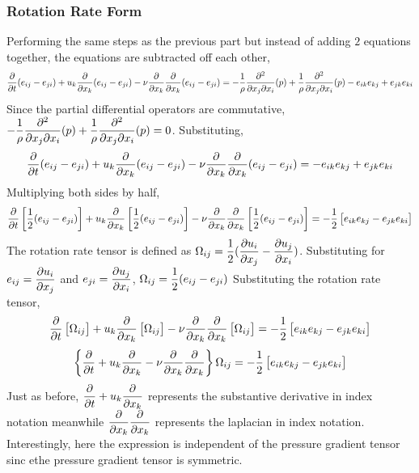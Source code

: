 \documentclass[class=report, 12pt, crop=false]{standalone}
\begin{document}
\begin{center}
\subsubsection{Rotation Rate Form}
\begin{comment}
\end{comment}
Performing the same steps as the previous part but instead of adding $2$ equations together, the equations are subtracted off each other,
$$\frac{\partial}{\partial t}(e_{ij}-e_{ji}) + u_k\frac{\partial }{\partial x_k}(e_{ij}-e_{ji}) - \nu\frac{\partial}{\partial x_k}\frac{\partial}{\partial x_k}(e_{ij}-e_{ji}) = -\frac{1}{\rho}\frac{\partial^2}{\partial x_j\partial x_i}(p) + \frac{1}{\rho}\frac{\partial^2}{\partial x_j\partial x_i}(p) - e_{ik}e_{kj} + e_{jk}e_{ki}$$
Since the partial differential operators are commutative, $\displaystyle{ -\frac{1}{\rho}\frac{\partial^2}{\partial x_j\partial x_i}(p) + \frac{1}{\rho}\frac{\partial^2}{\partial x_j\partial x_i}(p)=0}$. Substituting,
$$\frac{\partial}{\partial t}(e_{ij}-e_{ji}) + u_k\frac{\partial }{\partial x_k}(e_{ij}-e_{ji}) - \nu\frac{\partial}{\partial x_k}\frac{\partial}{\partial x_k}(e_{ij}-e_{ji}) = - e_{ik}e_{kj} + e_{jk}e_{ki}$$
Multiplying both sides by half,
$$\frac{\partial}{\partial t}\left[\frac{1}{2}(e_{ij}-e_{ji})\right] + u_k\frac{\partial }{\partial x_k}\left[\frac{1}{2}(e_{ij}-e_{ji})\right] - \nu\frac{\partial}{\partial x_k}\frac{\partial}{\partial x_k}\left[\frac{1}{2}(e_{ij}-e_{ji})\right] = - \frac{1}{2}\left[e_{ik}e_{kj} - e_{jk}e_{ki}\right]$$
The rotation rate tensor is defined as $\displaystyle{\Omega_{ij} = \frac{1}{2}(\frac{\partial u_i}{\partial x_j}-\frac{\partial u_j}{\partial x_i})}$. Substituting for $\displaystyle{e_{ij} = \frac{\partial u_i}{\partial x_j}}$ and $\displaystyle{e_{ji} = \frac{\partial u_j}{\partial x_i}}$, $\displaystyle{\Omega_{ij} = \frac{1}{2}(e_{ij}-e_{ji})}$
Substituting the rotation rate tensor,
$$\frac{\partial}{\partial t}\left[\Omega_{ij}\right] + u_k\frac{\partial }{\partial x_k}\left[\Omega_{ij}\right] - \nu\frac{\partial}{\partial x_k}\frac{\partial}{\partial x_k}\left[\Omega_{ij}\right] = - \frac{1}{2}\left[e_{ik}e_{kj} - e_{jk}e_{ki}\right]$$
$$\left\{\frac{\partial}{\partial t} + u_k\frac{\partial }{\partial x_k} - \nu\frac{\partial}{\partial x_k}\frac{\partial}{\partial x_k}\right\}\Omega_{ij} = - \frac{1}{2}\left[e_{ik}e_{kj} - e_{jk}e_{ki}\right]$$
Just as before, $\displaystyle{\frac{\partial}{\partial t} + u_k\frac{\partial}{\partial x_k}}$ represents the substantive derivative in index notation meanwhile $\displaystyle{\frac{\partial}{\partial x_k}\frac{\partial}{\partial x_k}}$ represents the laplacian in index notation. Interestingly, here the expression is independent of the pressure gradient tensor sinc ethe pressure gradient tensor is symmetric.
\end{center}
\end{document}

